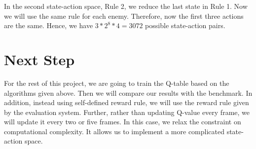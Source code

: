 In the second state-action space, Rule 2, we reduce the last state in Rule 1. Now we will use the same rule for each enemy. Therefore, now the first three actions are the same. Hence, we have $3*2^8*4 = 3072$ possible state-action pairs.

\section{Next Step}
For the rest of this project, we are going to train the Q-table based on the algorithms given above. Then we will compare our results with the benchmark. In addition, instead using self-defined reward rule, we will use the reward rule given by the evaluation system. Further, rather than updating Q-value every frame, we will update it every two or five frames. In this case, we relax the constraint on computational complexity. It allows us to implement a more complicated state-action space.

\newpage









%
